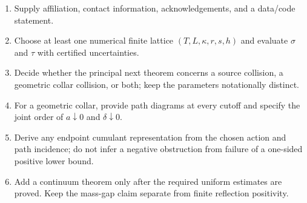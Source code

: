\documentclass[11pt]{article}
\begin{document}
\begin{enumerate}[label=\textbf{P\arabic*.}]
  \item Supply affiliation, contact information, acknowledgements, and a data/code statement.
  \item Choose at least one numerical finite lattice $(T,L,\kappa,r,s,h)$ and evaluate $\sigma$ and $\tau$ with certified uncertainties.
  \item Decide whether the principal next theorem concerns a source collision, a geometric collar collision, or both; keep the parameters notationally distinct.
  \item For a geometric collar, provide path diagrams at every cutoff and specify the joint order of $a\downarrow0$ and $\delta\downarrow0$.
  \item Derive any endpoint cumulant representation from the chosen action and path incidence; do not infer a negative obstruction from failure of a one-sided positive lower bound.
  \item Add a continuum theorem only after the required uniform estimates are proved.  Keep the mass-gap claim separate from finite reflection positivity.
\end{enumerate}
\end{document}
